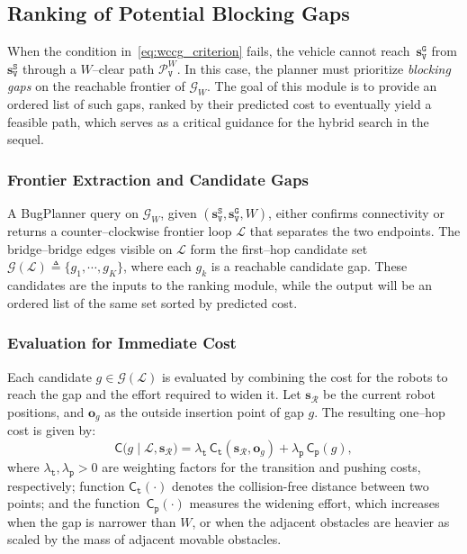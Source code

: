 \subsection{Ranking of Potential Blocking Gaps}\label{subsec:gap}

When the condition in~\eqref{eq:wccg_criterion} fails, the vehicle cannot
reach~$\mathbf{s}_\texttt{V}^{\texttt{G}}$ from
$\mathbf{s}_\texttt{V}^{\texttt{S}}$ through a $W$--clear path
$\mathcal{P}^W_\texttt{V}$. In this case, the planner must prioritize
\emph{blocking gaps} on the reachable frontier of $\mathcal{G}_W$. The goal of
this module is to provide an ordered list of such gaps, ranked by their
predicted cost to eventually yield a feasible path, which serves
as a critical guidance for the hybrid search in the sequel.

\subsubsection{Frontier Extraction and Candidate Gaps}
A BugPlanner query on $\mathcal{G}_W$, given
$(\mathbf{s}_\texttt{V}^{\texttt{S}},\mathbf{s}_\texttt{V}^{\texttt{G}},W)$,
either confirms connectivity or returns a counter--clockwise frontier loop
$\mathcal{L}$ that separates the two endpoints. The bridge--bridge edges
visible on $\mathcal{L}$ form the first--hop candidate set
$\mathcal{G}(\mathcal{L})\triangleq\{g_1,\cdots,g_K\}$,
where each $g_k$ is a reachable candidate gap. These candidates are the inputs
to the ranking module, while the output will be an ordered list of the same
set sorted by predicted cost.

\subsubsection{Evaluation for Immediate Cost}
Each candidate $g\in\mathcal{G}(\mathcal{L})$ is evaluated by combining the
cost for the robots to reach the gap and the effort required to widen it.
Let $\mathbf{s}_{\mathcal{R}}$ be the current robot positions,
and $\mathbf{o}_g$ as the outside insertion point of gap $g$. The
resulting one--hop cost is given by:
\begin{equation}\label{eq:step_cost}
\mathsf{C}\big(g \mid \mathcal{L}, \mathbf{s}_{\mathcal{R}}\big)
=\lambda_\texttt{t}\,\mathsf{C}_\texttt{t}\!\left(\mathbf{s}_{\mathcal{R}},\mathbf{o}_g\right)
+\lambda_\texttt{p}\,\mathsf{C}_\texttt{p}(g),
\end{equation}
where $\lambda_\texttt{t},\lambda_\texttt{p}>0$ are weighting factors
for the transition and pushing costs, respectively;
function $\mathsf{C}_\texttt{t}(\cdot)$ denotes the collision-free
distance between two points;
and the function~$\mathsf{C}_\texttt{p}(\cdot)$ measures the widening effort,
which increases when the gap is narrower than $W$,
or when the adjacent obstacles are heavier as scaled by the  mass of adjacent movable
obstacles.

